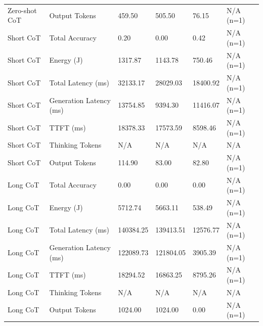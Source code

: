 \begin{table}
\begin{tabular}{llllll}
Zero-shot CoT & Output Tokens & 459.50 & 505.50 & 76.15 & N/A (n=1) \\
Short CoT & Total Accuracy & 0.20 & 0.00 & 0.42 & N/A (n=1) \\
Short CoT & Energy (J) & 1317.87 & 1143.78 & 750.46 & N/A (n=1) \\
Short CoT & Total Latency (ms) & 32133.17 & 28029.03 & 18400.92 & N/A (n=1) \\
Short CoT & Generation Latency (ms) & 13754.85 & 9394.30 & 11416.07 & N/A (n=1) \\
Short CoT & TTFT (ms) & 18378.33 & 17573.59 & 8598.46 & N/A (n=1) \\
Short CoT & Thinking Tokens & N/A & N/A & N/A & N/A \\
Short CoT & Output Tokens & 114.90 & 83.00 & 82.80 & N/A (n=1) \\
Long CoT & Total Accuracy & 0.00 & 0.00 & 0.00 & N/A (n=1) \\
Long CoT & Energy (J) & 5712.74 & 5663.11 & 538.49 & N/A (n=1) \\
Long CoT & Total Latency (ms) & 140384.25 & 139413.51 & 12576.77 & N/A (n=1) \\
Long CoT & Generation Latency (ms) & 122089.73 & 121804.05 & 3905.39 & N/A (n=1) \\
Long CoT & TTFT (ms) & 18294.52 & 16863.25 & 8795.26 & N/A (n=1) \\
Long CoT & Thinking Tokens & N/A & N/A & N/A & N/A \\
Long CoT & Output Tokens & 1024.00 & 1024.00 & 0.00 & N/A (n=1) \\
\bottomrule
\end{tabular}
\end{table}
